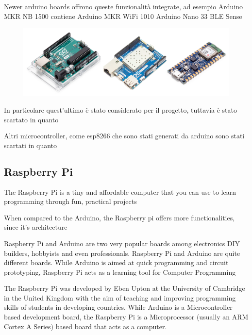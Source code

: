 		Newer arduino boards offrono queste funzionalità integrate, ad esempio 
		Arduino MKR NB 1500 contiene
		Arduino MKR WiFi 1010
		Arduino Nano 33 BLE Sense
				
		\begin{figure}
			\centering
			\includegraphics[width=\textwidth]{resources/img/chap3/arduino_types}
			\caption{}
		\end{figure}
				
		In particolare quest'ultimo è stato considerato per il progetto, tuttavia è stato scartato in quanto
		
		Altri microcontroller, come esp8266 che sono stati generati da arduino sono stati scartati in quanto
						
	\subsection{Raspberry Pi}
		
		The Raspberry Pi is a tiny and affordable computer that you can use to learn programming through fun, practical projects
		
		When compared to the Arduino, the Raspberry pi offers more functionalities, since it's architecture 
				
		Raspberry Pi and Arduino are two very popular boards among electronics DIY builders, hobbyists and even professionals. Raspberry Pi and Arduino are quite different boards. While Arduino is aimed at quick programming and circuit prototyping, Raspberry Pi acts as a learning tool for Computer Programming 
				
		The Raspberry Pi was developed by Eben Upton at the University of Cambridge in the United Kingdom with the aim of teaching and improving programming skills of students in developing countries. While Arduino is a Microcontroller based development board, the Raspberry Pi is a Microprocessor (usually an ARM Cortex A Series) based board that acts as a computer.
		
